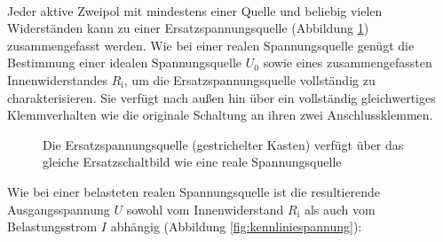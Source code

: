 \begin{frame}
{		\phantom{text}\\



		Jeder aktive Zweipol mit mindestens einer Quelle und beliebig vielen Widerständen kann zu einer
		Ersatzspannungsquelle (Abbildung \ref{fig:testiiiii}) zusammengefasst werden. Wie bei einer realen Spannungsquelle genügt die Bestimmung einer
		idealen Spannungsquelle $U_0$ sowie eines zusammengefassten Innenwiderstandes $R_\mathrm{i}$, um die
		Ersatzspannungsquelle vollständig zu charakterisieren.
		Sie verfügt nach außen hin über ein vollständig gleichwertiges Klemmverhalten wie die originale Schaltung an
		ihren zwei Anschlussklemmen.


		\begin{figure}[ht]

			\begin{center}


			\end{center}
			\caption{Die Ersatzspannungsquelle (gestrichelter Kasten) verfügt über das gleiche Ersatzschaltbild wie eine reale Spannungsquelle}


			\label{fig:testiiiii}


		\end{figure}





		Wie bei einer belasteten realen Spannungsquelle ist die resultierende Ausgangsspannung $U$
		sowohl vom Innenwiderstand $R_\mathrm{i}$ als auch vom Belastungsstrom $I$ abhängig (Abbildung \ref{fig:kennliniespannung}):

}
\end{frame}
